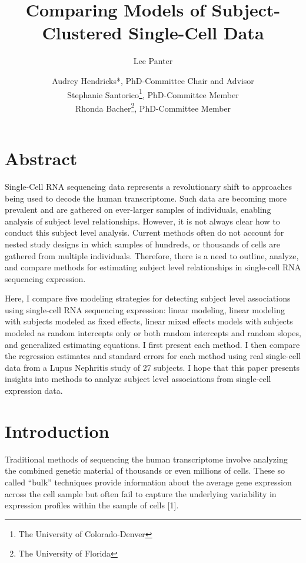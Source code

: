 \documentclass[12pt,]{article}
\title{Comparing Models of Subject-Clustered Single-Cell Data}
\subtitle{Lee Panter}
\author{Audrey Hendricks*, PhD-Committee Chair and Advisor \\ Stephanie Santorico\footnote{The University of Colorado-Denver},
PhD-Committee Member \\ Rhonda Bacher\footnote{The University of Florida}, PhD-Committee Member}
\date{}
\begin{document}
\maketitle

\hypertarget{abstract}{%
\section{Abstract}\label{abstract}}

\begin{onehalfspacing}

Single-Cell RNA sequencing data represents a revolutionary shift to approaches being used to decode the human transcriptome. Such data are becoming more prevalent and are gathered on ever-larger samples of individuals, enabling analysis of subject level relationships.  However, it is not always clear how to conduct this subject level analysis.  Current methods often do not account for nested study designs in which samples of hundreds, or thousands of cells are gathered from multiple individuals.  Therefore, there is a need to outline, analyze, and compare methods for estimating subject level relationships in single-cell RNA sequencing expression.  

Here, I compare five modeling strategies for detecting subject level associations using single-cell RNA sequencing expression: linear modeling, linear modeling with subjects modeled as fixed effects, linear mixed effects models with subjects modeled as random intercepts only or both random intercepts and random slopes, and generalized estimating equations.  I first present each method.  I then compare the regression estimates and standard errors for each method using real single-cell data from a Lupus Nephritis study of 27 subjects.  I hope that this paper presents insights into methods to analyze subject level associations from single-cell expression data.

\end{onehalfspacing}

\newpage

\setcounter{secnumdepth}{2}
\setcounter{tocdepth}{2}
\tableofcontents

\newpage

\hypertarget{introduction}{%
\section{Introduction}\label{introduction}}

Traditional methods of sequencing the human transcriptome involve
analyzing the combined genetic material of thousands or even millions of
cells. These so called ``bulk'' techniques provide information about the
average gene expression across the cell sample but often fail to capture
the underlying variability in expression profiles within the sample of
cells {[}1{]}.
\end{document}
